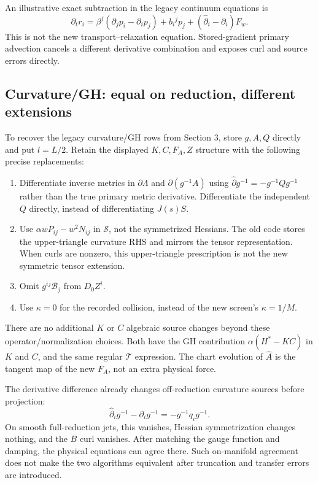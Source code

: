 \documentclass[11pt,letterpaper]{article}
\newcommand{\D}{D_0}\newcommand{\TF}{\operatorname{TF}}\newcommand{\tr}{\operatorname{tr}}
\begin{document}
An illustrative exact subtraction in the legacy continuum equations is
\begin{equation}
\partial_t r_i=\beta^j(\partial_jp_i-\partial_ip_j)
+b_i{}^jp_j+(\widehat\partial_i-\partial_i)F_w.
\end{equation}
This is not the new transport--relaxation equation. Stored-gradient primary advection cancels a different derivative combination and exposes curl and source errors directly.

\subsection{Curvature/GH: equal on reduction, different extensions}
To recover the legacy curvature/GH rows from Section 3, store $g,A,Q$ directly and put $l=L/2$. Retain the displayed $K,C,F_A,Z$ structure with the following precise replacements:
\begin{enumerate}
\item Differentiate inverse metrics in $\partial\Lambda$ and $\partial(g^{-1}A)$ using $\widehat\partial g^{-1}=-g^{-1}Qg^{-1}$ rather than the true primary metric derivative. Differentiate the independent $Q$ directly, instead of differentiating $J(s)S$.
\item Use $\alpha wP_{ij}-w^2N_{ij}$ in $\mathcal S$, not the symmetrized Hessians. The old code stores the upper-triangle curvature RHS and mirrors the tensor representation. When curls are nonzero, this upper-triangle prescription is not the new symmetric tensor extension.
\item Omit $g^{ij}\mathcal B_j$ from $\D Z^i$.
\item Use $\kappa=0$ for the recorded collision, instead of the new screen's $\kappa=1/M$.
\end{enumerate}
There are no additional $K$ or $C$ algebraic source changes beyond these operator/normalization choices. Both have the GH contribution $\alpha(H^*-KC)$ in $K$ and $C$, and the same regular $\mathcal T$ expression. The chart evolution of $\widehat A$ is the tangent map of the new $F_A$, not an extra physical force.

The derivative difference already changes off-reduction curvature sources before projection:
\begin{equation}
\widehat\partial_i g^{-1}-\partial_i g^{-1}=-g^{-1}q_i g^{-1}.
\end{equation}
On smooth full-reduction jets, this vanishes, Hessian symmetrization changes nothing, and the $B$ curl vanishes. After matching the gauge function and damping, the physical equations can agree there. Such on-manifold agreement does not make the two algorithms equivalent after truncation and transfer errors are introduced.
\end{document}

